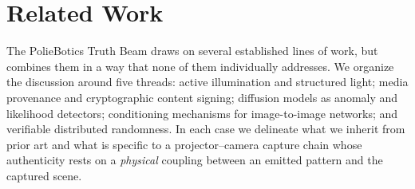 \section{Related Work}
\label{sec:related}

The PolieBotics Truth Beam draws on several established lines of work, but combines them in a way that none of them individually addresses. We organize the discussion around five threads: active illumination and structured light; media provenance and cryptographic content signing; diffusion models as anomaly and likelihood detectors; conditioning mechanisms for image-to-image networks; and verifiable distributed randomness. In each case we delineate what we inherit from prior art and what is specific to a projector--camera capture chain whose authenticity rests on a \emph{physical} coupling between an emitted pattern and the captured scene.

